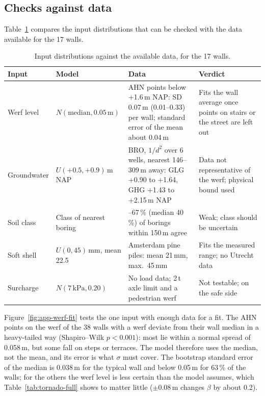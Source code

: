 \subsection{Checks against data}\label{app:prob-data}

Table~\ref{tab:prob-data} compares the input distributions that can be
checked with the data available for the 17 walls.

\begin{table}[htbp]
\centering
\small
\caption{Input distributions against the available data, for the 17 walls.}
\label{tab:prob-data}
\begin{tabularx}{\textwidth}{@{}l >{\raggedright\arraybackslash}p{3.4cm}
  >{\raggedright\arraybackslash}X >{\raggedright\arraybackslash}p{3.6cm}@{}}
\toprule
Input & Model & Data & Verdict \\
\midrule
Werf level & $N(\text{median}, 0.05\,\text{m})$ &
  AHN points below +1.6\,m NAP: SD 0.07\,m (0.01--0.33) per wall; standard error of the mean about 0.04\,m &
  Fits the wall average once points on stairs or the street are left out \\
Groundwater & $U(+0.5, +0.9)$\,m NAP &
  BRO, $1/d^2$ over 6 wells, nearest 146--309\,m away: GLG +0.90 to +1.64, GHG +1.43 to +2.15\,m NAP &
  Data not representative of the werf; physical bound used \\
Soil class & Class of nearest boring &
  25--67\,\% (median 40\,\%) of borings within 150\,m agree &
  Weak; class should be uncertain \\
Soft shell & $U(0, 45)$\,mm, mean 22.5 &
  Amsterdam pine piles: mean 21\,mm, max.\ 45\,mm \cite{hemel2023} &
  Fits the measured range; no Utrecht data \\
Surcharge & $N(7\,\text{kPa}, 0.20)$ &
  No load data; 2\,t axle limit and a pedestrian werf &
  Not testable; on the safe side \\
\bottomrule
\end{tabularx}
\end{table}

Figure~\ref{fig:app-werf-fit} tests the one input with enough data for a fit.
The AHN points on the werf of the 38 walls with a werf deviate from their wall
median in a heavy-tailed way (Shapiro--Wilk $p < 0.001$): most lie within a
normal spread of 0.058\,m, but some fall on steps or terraces. The model
therefore uses the median, not the mean, and its error is what $\sigma$ must
cover. The bootstrap standard error of the median is 0.038\,m for the typical
wall and below 0.05\,m for 63\,\% of the walls; for the others the werf level is
less certain than the model assumes, which Table~\ref{tab:tornado-full} shows
to matter little ($\pm$0.08\,m changes $\beta$ by about 0.2).

